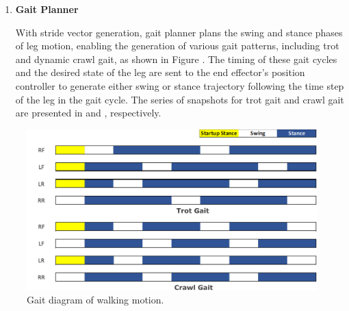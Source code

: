 \begin{enumerate}
    \item \textbf{Gait Planner}
    
\hspace{0.5cm}With stride vector generation, gait planner plans the swing and stance phases of leg motion, enabling the generation of various gait patterns, including trot and dynamic crawl gait, as shown in Figure . The timing of these gait cycles and the desired state of the leg are sent to the end effector's position controller to generate either swing or stance trajectory following the time step of the leg in the gait cycle. The series of snapshots for trot gait and crawl gait are presented in  and , respectively.
\end{enumerate}

\begin{figure}[t]
  \centering
  \includegraphics[width=\linewidth]{./fig/locomotion/diagram/gaitdiagram.pdf}
  \vspace{2mm}
  \caption{Gait diagram of walking motion.}\label{gait_diagram}
\end{figure}

